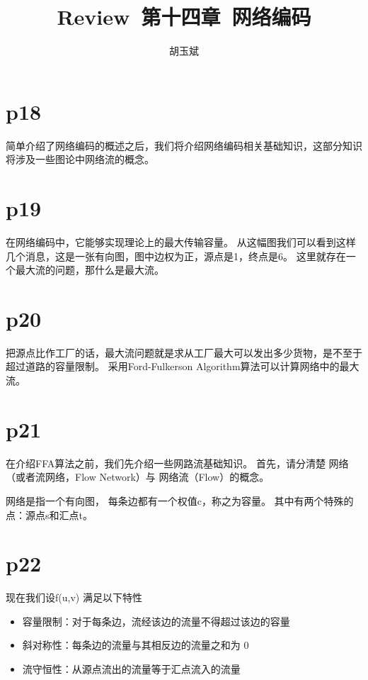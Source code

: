 \documentclass[onecolumn,oneside]{BUPTHomework}
\author{胡玉斌}
\title{Review\ 第十四章\ 网络编码}
\begin{document}
  \maketitle
  
  \section*{p18}

  简单介绍了网络编码的概述之后，我们将介绍网络编码相关基础知识，这部分知识将涉及一些图论中网络流的概念。

  \section*{p19}
  
  在网络编码中，它能够实现理论上的最大传输容量。
  从这幅图我们可以看到这样几个消息，这是一张有向图，图中边权为正，源点是1，终点是6。
  这里就存在一个最大流的问题，那什么是最大流。

  \section*{p20}

  把源点比作工厂的话，最大流问题就是求从工厂最大可以发出多少货物，是不至于超过道路的容量限制。
  采用Ford-Fulkerson Algorithm算法可以计算网络中的最大流。

  \section*{p21}

  在介绍FFA算法之前，我们先介绍一些网路流基础知识。
  首先，请分清楚 网络（或者流网络，Flow Network）与 网络流（Flow）的概念。

  网络是指一个有向图，
  每条边都有一个权值c，称之为容量。
  其中有两个特殊的点：源点s和汇点t。

  \section*{p22}

  现在我们设f(u,v) 满足以下特性

  \begin{itemize}
    \item 容量限制：对于每条边，流经该边的流量不得超过该边的容量
    \item 斜对称性：每条边的流量与其相反边的流量之和为 0
    \item 流守恒性：从源点流出的流量等于汇点流入的流量
  \end{itemize}
\end{document}
